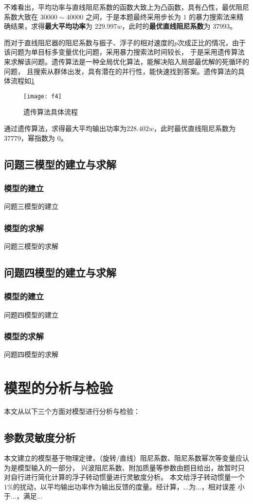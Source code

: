 \documentclass[withoutpreface,bwprint]{cumcmthesis} %
\begin{document}
    不难看出，平均功率与直线阻尼系数的函数大致上为凸函数，具有凸性，最优阻尼系数大致在 $30000 \sim 40000$ 之间，于是本题最终采用步长为 $1$ 的暴力搜索法来精确结果，求得\textbf{最大平均功率}为 $229.997w$，此时的\textbf{最优直线阻尼系数}为 $37993$。

    而对于直线阻尼器的阻尼系数与振子、浮子的相对速度的$p$次成正比的情况，由于该问题为单目标多变量优化问题，采用暴力搜索法时间较长，
    于是采用遗传算法来求解该问题。遗传算法是一种全局优化算法，能解决陷入局部最优解的死循环的问题，
    且搜索从群体出发，具有潜在的并行性，能快速找到答案。遗传算法的具体流程如\cref{fig:GA}

    \begin{figure}[!htbp]
        \centering
        \texttt{[image: f4]}
        \caption{遗传算法具体流程}
        \label{fig:GA}
    \end{figure}

    通过遗传算法，求得最大平均输出功率为$228.402w$，此时最优直线阻尼系数为$37779$，幂指数为 $0$。
    \subsection{问题三模型的建立与求解}
    \subsubsection{模型的建立}
    问题三模型的建立
    \subsubsection{模型的求解}
    问题三模型的求解
    \subsection{问题四模型的建立与求解}
    \subsubsection{模型的建立}
    问题四模型的建立
    \subsubsection{模型的求解}
    问题四模型的求解
    \section{模型的分析与检验}
    本文从以下三个方面对模型进行分析与检验：
    \subsection{参数灵敏度分析}
    本文建立的模型基于物理定律，（旋转/直线）阻尼系数、阻尼系数幂次等变量应认为是模型输入的一部分，
    兴波阻尼系数、附加质量等参数由题目给出，故暂时只对自行进行简化计算的浮子转动惯量进行灵敏度分析。
    本文给浮子转动惯量一个$ 1\% $的扰动，以平均输出功率作为输出反馈的度量。经计算，...为...，相对误差 
    小于...，满足...
    
\end{document}
